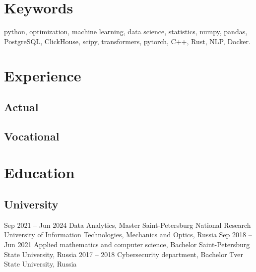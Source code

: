 \documentclass[11pt,a4paper]{moderncv}
\begin{document}
\maketitle

\section{Keywords}
\cvline
{}{python, optimization, machine learning, data science, statistics, numpy, pandas, PostgreSQL, ClickHouse, scipy, transformers, pytorch, C++, Rust, NLP, Docker.}
\section{Experience}

\subsection{Actual}
\subsection{Vocational}

\section{Education}
\subsection{University}
\cventry
{Sep 2021 -- Jun 2024}
{Data Analytics, Master}
{Saint-Petersburg National Research University of Information Technologies, Mechanics and Optics, Russia}
{}{}{}
\cventry
{Sep 2018 -- Jun 2021}
{Applied mathematics and computer science, Bachelor}
{Saint-Petersburg State University, Russia}
{}{}{}
\cventry
{2017 -- 2018}
{Cybersecurity department, Bachelor}
{Tver State University, Russia}
{}{}{}
\end{document}
